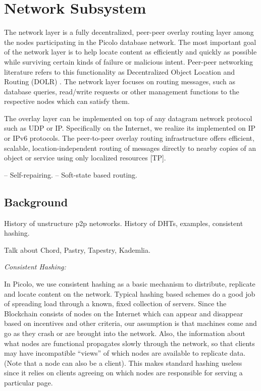 \section{Network Subsystem} 

The network layer is a fully decentralized, peer-peer overlay routing layer among the nodes participating in the Picolo database network. The most important
goal of the network layer is to help locate content as efficiently and quickly as possible while surviving certain kinds of failure or malicious intent. Peer-peer networking literature refers to this functionality as Decentralized Object Location and Routing (DOLR) \cite{dolr2003}. The network layer focuses on routing messages, such as database queries, read/write requests or other management functions to the respective nodes which can satisfy them. 

The overlay layer can be implemented on top of any datagram network protocol such as UDP or IP. Specifically on the Internet, we realize its implemented on IP or IPv6 protocols.
The peer-to-peer overlay routing infrastructure offers efficient, scalable, location-independent
routing of messages directly to nearby copies of an object or service using only localized resources [TP].

-- Self-repairing.
-- Soft-state based routing.

\subsection{Background}

History of unstructure p2p netoworks.
History of DHTs, examples, consistent hashing.

Talk about Chord, Pastry, Tapestry, Kademlia.

{\em Consistent Hashing:} 

In Picolo, we use consistent hashing as a basic mechanism to distribute, replicate and locate content on the network.
Typical hashing based schemes do a good job of spreading load through a known, fixed collection of servers. Since the
Blockchain consists of nodes on the Internet which can appear and disappear based on incentives and other criteria, our
assumption is that machines come and go as they crash or are brought into the network. Also,
the information about what nodes are functional propagates slowly through the
network, so that clients may have incompatible “views” of which nodes are available to replicate data. (Note that a
node can also be a client). This makes standard hashing useless since it relies on clients agreeing on which nodes are responsible for serving a particular
page.

